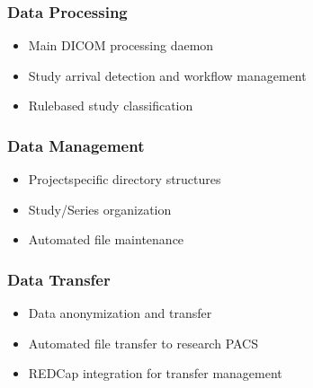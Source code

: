\documentclass[letterpaper,10pt,english]{sphinxmanual}
\begin{document}
\subsubsection{Data Processing}
\label{\detokenize{Temp/architecture-options:data-processing}}\begin{itemize}
\item {} 
\sphinxAtStartPar
{} \sphinxhyphen{} Main DICOM processing daemon

\item {} 
\sphinxAtStartPar
{} \sphinxhyphen{} Study arrival detection and workflow management

\item {} 
\sphinxAtStartPar
{} \sphinxhyphen{} Rule\sphinxhyphen{}based study classification

\end{itemize}


\subsubsection{Data Management}
\label{\detokenize{Temp/architecture-options:data-management}}\begin{itemize}
\item {} 
\sphinxAtStartPar
{} \sphinxhyphen{} Project\sphinxhyphen{}specific directory structures

\item {} 
\sphinxAtStartPar
{} \sphinxhyphen{} Study/Series organization

\item {} 
\sphinxAtStartPar
{} \sphinxhyphen{} Automated file maintenance

\end{itemize}


\subsubsection{Data Transfer}
\label{\detokenize{Temp/architecture-options:data-transfer}}\begin{itemize}
\item {} 
\sphinxAtStartPar
{} \sphinxhyphen{} Data anonymization and transfer

\item {} 
\sphinxAtStartPar
{} \sphinxhyphen{} Automated file transfer to research PACS

\item {} 
\sphinxAtStartPar
{} \sphinxhyphen{} REDCap integration for transfer management

\end{itemize}
\end{document}
